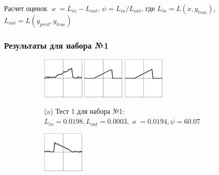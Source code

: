 \documentclass{beamer}
\renewcommand{\kappa}{\varkappa}
\begin{document}
\begin{frame}
	\vspace{-0.75em}
	\begin{block}{Расчет оценок}
		$\kappa = L_{in} - L_{out}$, $\psi = L_{in} / L_{out}$, где $L_{in} = L(x, y_{true})$, $L_{out} = L(y_{pred}, y_{true})$
	 \end{block}
	 
	\vspace{-0.5em}
	\frametitle{Результаты для набора №1}
	\begin{figure}[!hp]
		\centering
		\begin{subfigure}{\textwidth}
			\centering
			\includegraphics[width=0.22\textwidth]{res_n1_1}
			\hfill
			\includegraphics[width=0.22\textwidth]{res_n1_2}
			\hfill
			\includegraphics[width=0.22\textwidth]{1}
			\caption*{\small (a) Тест 1 для набора №1: $L_{in} = 0.0198, 
				L_{out} = 0.0003, 
				\kappa = 0.0194,
				\psi = 60.07
				$}
		\end{subfigure}
		\vspace{-1.2em}
		\begin{subfigure}{\textwidth}
			\centering
			\includegraphics[width=0.22\textwidth]{res_n1_3}

\end{subfigure}
\end{figure}
\end{frame}
\end{document}
